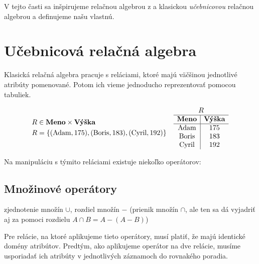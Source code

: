 V tejto časti sa inšpirujeme relačnou algebrou z \cite{RAcompilator} a klasickou
\textit{učebnicovou} relačnou algebrou a definujeme našu vlastnú.

\section{Učebnicová relačná algebra}
Klasická relačná algebra pracuje s reláciami, ktoré majú väčšinou jednotlivé atribúty pomenované.
Potom ich vieme jednoducho reprezentovať pomocou tabuliek.

\begin{priklad}
    \[
    \begin{array}{c c}
        \begin{aligned}
            R &\in \textbf{Meno} \times \textbf{Výška} \\
            R &= \{(\text{Adam}, 175), (\text{Boris}, 183), (\text{Cyril}, 192)\}
        \end{aligned}
        &
        \begin{array}{c|c}
            \multicolumn{2}{c}{R} \\ \hline
            \textbf{Meno}  & \textbf{Výška} \\ \hline
            \text{Adam}  & 175 \\
            \text{Boris} & 183 \\
            \text{Cyril} & 192
        \end{array}
    \end{array}
    \]
\end{priklad}

Na manipuláciu s týmito reláciami existuje niekoľko operátorov:

\subsection*{\textbf{Množinové operátory}} zjednotenie množín $\cup$, rozdiel množín $-$ (prienik
množín $\cap$, ale ten sa dá vyjadriť aj za pomoci rozdielu $A \cap B = A - (A-B)$)

Pre relácie, na ktoré aplikujeme tieto operátory, musí platiť, že majú identické domény atribútov.
Predtým, ako aplikujeme operátor na dve relácie, musíme usporiadať ich atribúty v jednotlivých
záznamoch do rovnakého poradia.

